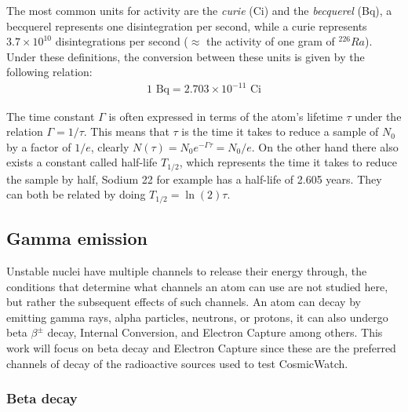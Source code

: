 The most common units for activity are the \textit{curie} (Ci) and the \textit{becquerel} (Bq), a becquerel represents one disintegration per second, while a curie represents $3.7\times10^{10}$ disintegrations per second ($\approx$ the activity of one gram of $^{226}Ra$). Under these definitions, the conversion between these units is given by the following relation:
\begin{eqnarray}
    1 \text{~Bq} = 2.703\times10^{-11} \text{~Ci}
\end{eqnarray}

The time constant $\Gamma$ is often expressed in terms of the atom's lifetime $\tau$ under the relation $\Gamma=1/\tau$. This means that $\tau$ is the time it takes to reduce a sample of $N_0$ by a factor of $1/e$, clearly $N(\tau)=N_0e^{-\Gamma \tau} = N_0/e$. On the other hand there also exists a constant called half-life $T_{1/2}$, which represents the time it takes to reduce the sample by half, Sodium 22 for example has a half-life of 2.605 years. They can both be related by doing $T_{1/2} = \ln (2)\tau$.


\subsection{Gamma emission}

Unstable nuclei have multiple channels to release their energy through, the conditions that determine what channels an atom can use are not studied here, but rather the subsequent effects of such channels. An atom can decay by emitting gamma rays, alpha particles, neutrons, or protons, it can also undergo beta $\beta^{\pm}$ decay, Internal Conversion, and Electron Capture among others. This work will focus on beta decay and Electron Capture since these are the preferred channels of decay of the radioactive sources used to test CosmicWatch.

\subsubsection{Beta decay}

